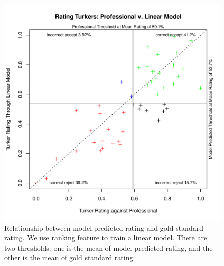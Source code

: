 \documentclass[11pt]{article}
\begin{document}
\begin{figure}[htbp]
  \centering
  \includegraphics[width=\linewidth]{RankingFeature/rrankingrankingfeaturelm2.pdf}
  \caption{Relationship between model predicted rating and gold standard rating. We use ranking feature to train a linear model. There are two thresholds: one is the mean of model predicted rating, and the other is the mean of gold standard rating.}
    \label{flmrankingrrating2}
\end{figure}
\end{document}
